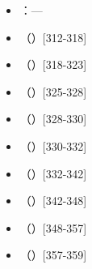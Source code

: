 \begin{itemize}
\item {}：—
\end{itemize}

\begin{itemize}
\item {}（）[312-318]
\end{itemize}

\begin{itemize}
\item {}（）[318-323]
\end{itemize}

\begin{itemize}
\item {}（）[325-328]
\end{itemize}

\begin{itemize}
\item {}（）[328-330]
\end{itemize}

\begin{itemize}
\item {}（）[330-332]
\end{itemize}

\begin{itemize}
\item {}（）[332-342]
\end{itemize}

\begin{itemize}
\item {}（）[342-348]
\end{itemize}

\begin{itemize}
\item {}（）[348-357]
\end{itemize}

\begin{itemize}
\item {}（）[357-359]
\end{itemize}

